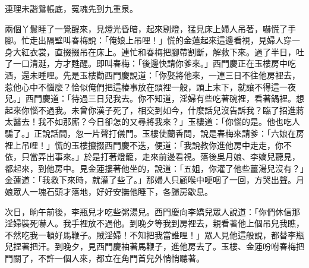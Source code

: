 \begin{showcontents}{}
連理未諧鴛帳底，冤魂先到九重泉。

兩個丫鬟睡了一覺醒來，見燈光昏暗，起來剔燈，猛見床上婦人吊著，嚇慌了手腳。忙走出隔壁叫春梅說：「俺娘上吊哩！」慌的金蓮起來這邊看視，見婦人穿一身大紅衣裳，直掇掇吊在床上。連忙和春梅把腳帶割斷，解救下來。過了半日，吐了一口清涎，方才甦醒。即叫春梅：「後邊快請你爹來。」西門慶正在玉樓房中吃酒，還未睡哩。先是玉樓勸西門慶說道：「你娶將他來，一連三日不往他房裡去，惹他心中不惱麼？恰似俺們把這椿事放在頭裡一般，頭上末下，就讓不得這一夜兒。」西門慶道：「待過三日兒我去。你不知道，淫婦有些吃著碗裡，看著鍋裡。想起來你惱不過我。未曾你漢子死了，相交到如今，什麼話兒沒告訴我？臨了招進蔣太醫去！我不如那廝？今日卻怎的又尋將我來？」玉樓道：「你惱的是。他也吃人騙了。」正說話間，忽一片聲打儀門。玉樓使蘭香問，說是春梅來請爹：「六娘在房裡上吊哩！」慌的玉樓攛掇西門慶不迭，便道：「我說教你進他房中走走，你不依，只當弄出事來。」於是打著燈籠，走來前邊看視。落後吳月娘、李嬌兒聽見，都起來，到他房中。見金蓮摟著他坐的，說道：「五姐，你灌了他些薑湯兒沒有？」金蓮道：「我救下來時，就灌了些了。」那婦人只顧喉中哽咽了一回，方哭出聲。月娘眾人一塊石頭才落地，好好安撫他睡下，各歸房歇息。

次日，晌午前後，李瓶兒才吃些粥湯兒。西門慶向李嬌兒眾人說道：「你們休信那淫婦裝死嚇人。我手裡放不過他。到晚夕等我到房裡去，親看著他上個吊兒我瞧，不然吃我一頓好馬鞭子。賊淫婦！不知把我當誰哩！」眾人見他這般說，都替李瓶兒捏著把汗。到晚夕，見西門慶袖著馬鞭子，進他房去了。玉樓、金蓮吩咐春梅把門關了，不許一個人來，都立在角門首兒外悄悄聽著。


\end{showcontents}
